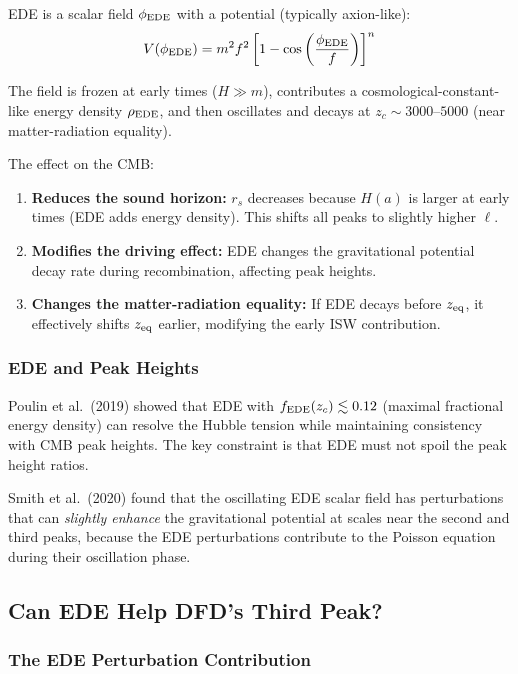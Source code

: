 \documentclass[11pt,a4paper]{article}
\begin{document}
EDE is a scalar field $\phi_{\rm EDE}$ with a potential (typically axion-like):
\begin{equation}
V(\phi_{\rm EDE}) = m^2 f^2\left[1 - \cos\left(\frac{\phi_{\rm EDE}}{f}\right)\right]^n
\end{equation}

The field is frozen at early times ($H \gg m$), contributes a cosmological-constant-like energy density $\rho_{\rm EDE}$, and then oscillates and decays at $z_c \sim 3000$--$5000$ (near matter-radiation equality).

The effect on the CMB:
\begin{enumerate}
\item \textbf{Reduces the sound horizon:} $r_s$ decreases because $H(a)$ is larger at early times (EDE adds energy density). This shifts all peaks to slightly higher $\ell$.
\item \textbf{Modifies the driving effect:} EDE changes the gravitational potential decay rate during recombination, affecting peak heights.
\item \textbf{Changes the matter-radiation equality:} If EDE decays before $z_{\rm eq}$, it effectively shifts $z_{\rm eq}$ earlier, modifying the early ISW contribution.
\end{enumerate}

\subsubsection{EDE and Peak Heights}

Poulin et al.\ (2019) showed that EDE with $f_{\rm EDE}(z_c) \lesssim 0.12$ (maximal fractional energy density) can resolve the Hubble tension while maintaining consistency with CMB peak heights. The key constraint is that EDE must not spoil the peak height ratios.

Smith et al.\ (2020) found that the oscillating EDE scalar field has perturbations that can \emph{slightly enhance} the gravitational potential at scales near the second and third peaks, because the EDE perturbations contribute to the Poisson equation during their oscillation phase.

\subsection{Can EDE Help DFD's Third Peak?}

\subsubsection{The EDE Perturbation Contribution}
\end{document}
